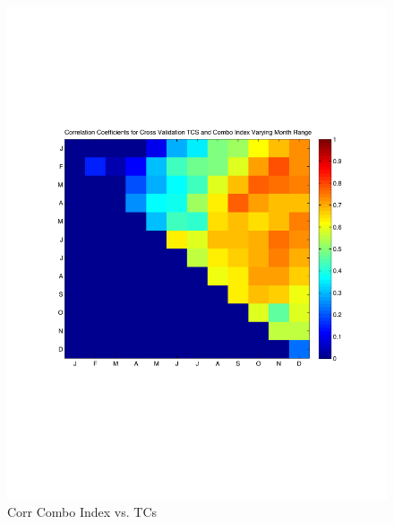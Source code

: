 \documentclass[]{article}
\begin{document}
\begin{figure}[ht]
\begin{minipage}[b]{0.6\linewidth}
\includegraphics[width=\textwidth]{figures/comboIndex/crossValidation/monthlySensitivityTestTCS.pdf}
\caption{Corr Combo Index vs. TCs}
\label{fig:figure41}
\end{minipage}
\hspace{0cm}
\begin{minipage}[b]{0.6\linewidth}
\end{minipage}
\end{figure}

\clearpage


\end{document}
